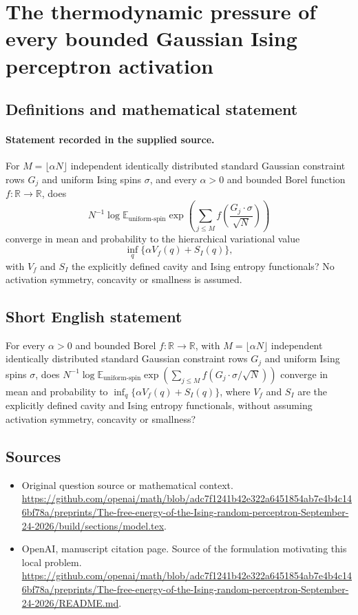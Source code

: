 \documentclass[11pt]{article}
\begin{document}
\section*{The thermodynamic pressure of every bounded Gaussian Ising perceptron activation}\label{statement}
\subsection{Definitions and mathematical statement}
\paragraph{Statement recorded in the supplied source.}
For $M=\lfloor\alpha N\rfloor$ independent identically distributed standard Gaussian constraint rows $G_j$ and uniform Ising spins $\sigma$, and every $\alpha>0$ and bounded Borel function $f:\mathbb{R}\to\mathbb{R}$, does
\[
N^{-1}\log\mathbb{E}_{\mathrm{uniform\text{-}spin}}
\exp\left(\sum_{j\leq M}f\left(\frac{G_j\cdot\sigma}{\sqrt N}\right)\right)
\]
converge in mean and probability to the hierarchical variational value
\[
\inf_q\{\alpha V_f(q)+S_I(q)\},
\]
with $V_f$ and $S_I$ the explicitly defined cavity and Ising entropy functionals? No activation symmetry, concavity or smallness is assumed.
\subsection{Short English statement}
For every $\alpha>0$ and bounded Borel $f:\mathbb{R}\to\mathbb{R}$, with $M=\lfloor\alpha N\rfloor$ independent identically distributed standard Gaussian constraint rows $G_j$ and uniform Ising spins $\sigma$, does $N^{-1}\log\mathbb{E}_{\mathrm{uniform\text{-}spin}}\exp(\sum_{j\leq M}f(G_j\cdot\sigma/\sqrt N))$ converge in mean and probability to $\inf_q\{\alpha V_f(q)+S_I(q)\}$, where $V_f$ and $S_I$ are the explicitly defined cavity and Ising entropy functionals, without assuming activation symmetry, concavity or smallness?
\subsection{Sources}
\begin{itemize}
\item[S1] Original question source or mathematical context.
\url{https://github.com/openai/math/blob/adc7f1241b42e322a6451854ab7e4b4c146bf78a/preprints/The-free-energy-of-the-Ising-random-perceptron-September-24-2026/build/sections/model.tex}.
\item[S2] OpenAI, manuscript citation page. Source of the formulation motivating this local problem.
\url{https://github.com/openai/math/blob/adc7f1241b42e322a6451854ab7e4b4c146bf78a/preprints/The-free-energy-of-the-Ising-random-perceptron-September-24-2026/README.md}.
\end{itemize}
\end{document}
